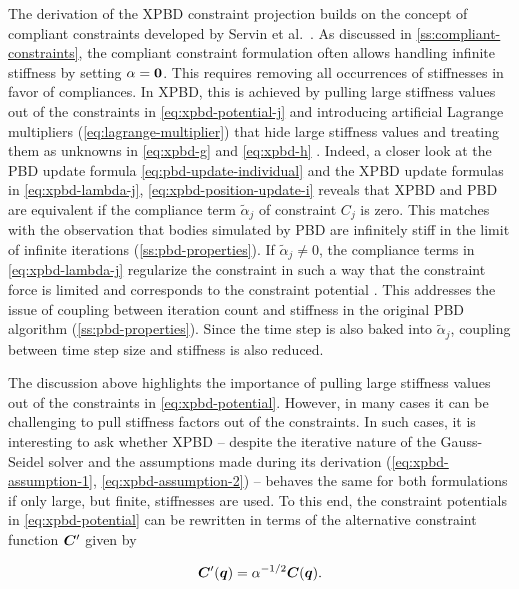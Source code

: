 The derivation of the XPBD constraint projection builds on the concept of compliant constraints developed by Servin et al.\ 
\cite{servin2006}. As discussed in \cref{ss:compliant-constraints}, the compliant constraint formulation often allows handling infinite stiffness by
setting $\mathbf{\alpha} = \mathbf{0}$. This requires removing all occurrences of stiffnesses in favor of compliances. In XPBD, this is achieved by
pulling large stiffness values out of the constraints in \autoref{eq:xpbd-potential-j} and introducing artificial Lagrange multipliers 
(\cref{eq:lagrange-multiplier}) that hide large stiffness values and treating them as unknowns in \autoref{eq:xpbd-g} and \autoref{eq:xpbd-h} . 
Indeed, a closer look at the PBD update formula 
\autoref{eq:pbd-update-individual} and the XPBD update formulas in \autoref{eq:xpbd-lambda-j}, \autoref{eq:xpbd-position-update-i} reveals that XPBD and 
PBD are equivalent if the compliance term $\tilde{\alpha}_j$ of constraint $C_j$ is zero. This matches with the observation that bodies 
simulated by PBD are infinitely stiff in the limit of infinite iterations (\cref{ss:pbd-properties}). If $\tilde{\alpha}_j \neq 0$, the 
compliance terms in \autoref{eq:xpbd-lambda-j} regularize the constraint in such a way that the constraint force is limited and corresponds 
to the constraint potential \cite{macklin2016}. This addresses the issue of coupling
between iteration count and stiffness in the original PBD algorithm (\cref{ss:pbd-properties}). Since the time step is also baked into 
$\tilde{\alpha}_j$, coupling between time step size and stiffness is also reduced.

The discussion above highlights the importance of pulling large stiffness values out of the constraints in \autoref{eq:xpbd-potential}. 
However, in many cases it can be challenging to pull stiffness factors out of the constraints. In such cases, it is interesting to ask 
whether XPBD -- despite the iterative nature of the Gauss-Seidel solver and the assumptions made during its derivation 
(\cref{eq:xpbd-assumption-1}, \cref{eq:xpbd-assumption-2}) -- behaves the same for both formulations if only large, but finite, 
stiffnesses are used.
To this end, the constraint potentials in \autoref{eq:xpbd-potential} can be rewritten in terms of the alternative constraint 
function $\bm{C}^{\prime}$ given by

\begin{equation}\label{eq:xpbd-alt-constraint}
    \bm{C}^{\prime}(\bm{q}) = \mathbf{\alpha}^{-1/2}\bm{C}(\bm{q}).
\end{equation}

